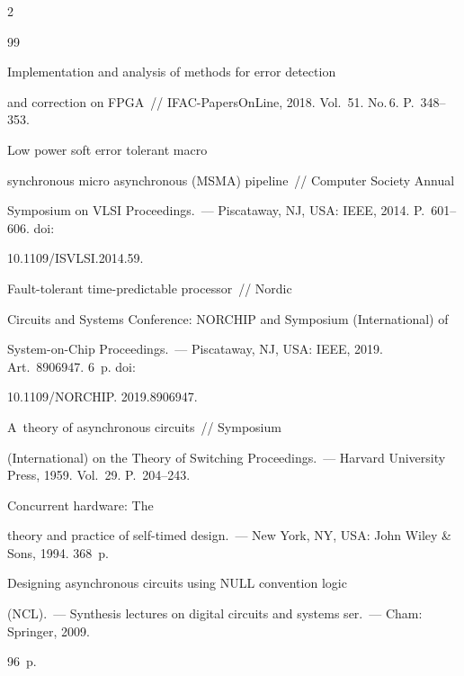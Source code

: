 \begin{multicols}{2}
{{\begin{thebibliography}{99}

  Implementation and analysis of methods for error detection 

and correction on FPGA~// IFAC-PapersOnLine, 2018. Vol.~51. No.\,6. P.~348--353.

 


  Low power soft error tolerant macro 

synchronous micro asynchronous (MSMA) pipeline~// Computer Society Annual 

Symposium on VLSI Proceedings.~--- Piscataway, NJ, USA: IEEE, 2014. P.~601--606. doi: 

10.1109/ISVLSI.2014.59.




  Fault-tolerant time-predictable processor~// Nordic 

Circuits and Systems Conference: NORCHIP and Symposium (International) of  

System-on-Chip Proceedings.~--- Piscataway, NJ, USA: IEEE, 2019. Art.\ 8906947. 6~p. doi: 

10.1109/NORCHIP. 2019.8906947.




  A~theory of asynchronous circuits~// Symposium 

(International) on the Theory of Switching Proceedings.~--- Harvard University Press, 1959. Vol.~29. P.~204--243.


  Concurrent hardware: The 

theory and practice of self-timed design.~--- New York, NY, USA: John Wiley \& Sons, 1994. 368~p.


  Designing asynchronous circuits using NULL convention logic 

(NCL).~--- Synthesis lectures on digital circuits and systems ser.~--- Cham: Springer, 2009. %

96~p.


\end{thebibliography}}}
\end{multicols}
